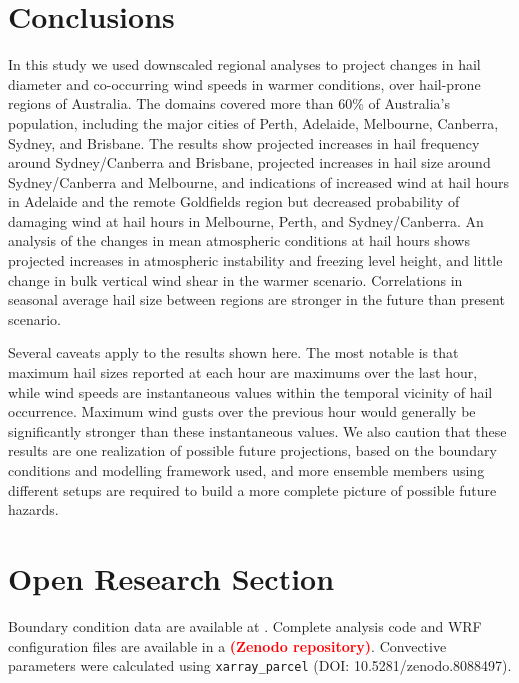 \documentclass[]{agujournal2019}\usepackage[]{graphicx}\usepackage[]{xcolor}
\newcommand*{\todo}[1]{\textbf{\textcolor{red}{(#1)}}}
\begin{document}
\section{Conclusions}

In this study we used downscaled regional analyses to project changes in hail diameter and co-occurring wind speeds in warmer conditions, over hail-prone regions of Australia. The domains covered more than 60\% of Australia's population, including the major cities of Perth, Adelaide, Melbourne, Canberra, Sydney, and Brisbane. The results show projected increases in hail frequency around Sydney/Canberra and Brisbane, projected increases in hail size around Sydney/Canberra and Melbourne, and indications of increased wind at hail hours in Adelaide and the remote Goldfields region but decreased probability of damaging wind at hail hours in Melbourne, Perth, and Sydney/Canberra. An analysis of the changes in mean atmospheric conditions at hail hours shows projected increases in atmospheric instability and freezing level height, and little change in bulk vertical wind shear in the warmer scenario. Correlations in seasonal average hail size between regions are stronger in the future than present scenario. 

Several caveats apply to the results shown here. The most notable is that maximum hail sizes reported at each hour are maximums over the last hour, while wind speeds are instantaneous values within the temporal vicinity of hail occurrence. Maximum wind gusts over the previous hour would generally be significantly stronger than these instantaneous values. We also caution that these results are one realization of possible future projections, based on the boundary conditions and modelling framework used, and more ensemble members using different setups are required to build a more complete picture of possible future hazards.

\section*{Open Research Section}

Boundary condition data are available at . Complete analysis code and WRF configuration files are available in a \todo{Zenodo repository}. Convective parameters were calculated using \texttt{xarray\_parcel} (DOI: 10.5281/zenodo.8088497).

\end{document}
